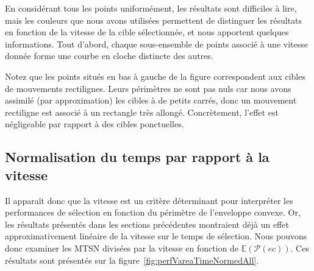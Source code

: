 	En considérant tous les points uniformément, les résultats sont difficiles à lire, mais les couleurs que nous avons utilisées permettent de distinguer les résultats en fonction de la vitesse de la cible sélectionnée, et nous apportent quelques informations. Tout d'abord, chaque sous-ensemble de points associé à une vitesse donnée forme une courbe \og en cloche \fg{} distincte des autres.
	
	Notez que les points situés en bas à gauche de la figure correspondent aux cibles de mouvements rectilignes. Leurs périmètres ne sont pas nuls car nous avons assimilé (par approximation) les cibles à de petits carrés, donc un mouvement rectiligne est associé à un rectangle très allongé. Concrètement, l'effet est négligeable par rapport à des cibles ponctuelles.
	
	\subsection{Normalisation du temps par rapport à la vitesse}
	Il apparaît donc que la vitesse est un critère déterminant pour interpréter les performances de sélection en fonction du périmètre de l'enveloppe convexe. Or, les résultats présentés dans les sections précédentes montraient déjà un effet approximativement linéaire de la vitesse sur le temps de sélection. Nous pouvons donc examiner les MTSN divisées par la vitesse en fonction de $\mathbb{E}(\mathcal{P}(ec))$. Ces résultats sont présentés sur la figure~\ref{fig:perfVareaTimeNormedAll}.

